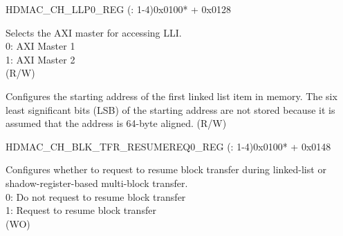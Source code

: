 \begin{register}{H}{DMAC\_CH\_LLP0\_REG (: 1-4)}{0x0100* + 0x0128}\label{regdesc:DMACCHNLLP0REG}
%
%
%
\regnewline%
\begin{regdesc}\begin{reglist}
\label{fielddesc:DMACCHNLMS}\item [DMAC\_CH\regindex{n}\_LMS] Selects the AXI master for accessing LLI. \\
0: AXI Master 1 \\
1: AXI Master 2 \\
(R/W)
\label{fielddesc:DMACCHNLOC0}\item [DMAC\_CH\regindex{n}\_LOC0] Configures the starting address of the first linked list item in memory. The six least significant bits (LSB) of the starting address are not stored because it is assumed that the address is 64-byte aligned. (R/W)

\end{reglist}\end{regdesc}
\end{register}


\begin{register}{H}{DMAC\_CH\_BLK\_TFR\_RESUMEREQ0\_REG (: 1-4)}{0x0100* + 0x0148}\label{regdesc:DMACCHNBLKTFRRESUMEREQ0REG}
%
%
\regnewline%
\begin{regdesc}\begin{reglist}
\label{fielddesc:DMACCHNBLKTFRRESUMEREQ}\item [DMAC\_CH\regindex{n}\_BLK\_TFR\_RESUMEREQ] Configures whether to request to resume block transfer during linked-list or shadow-register-based multi-block transfer. \\
0: Do not request to resume block transfer \\
1: Request to resume block transfer \\
(WO)
\end{reglist}\end{regdesc}
\end{register}


